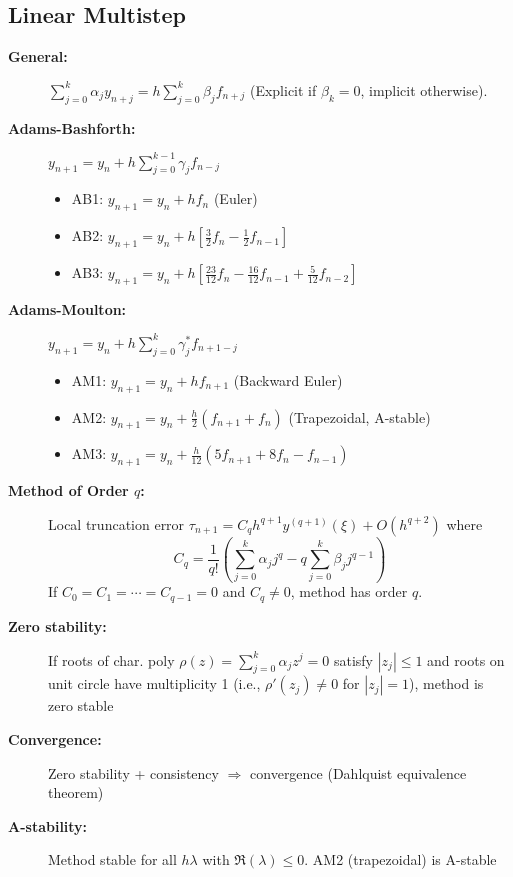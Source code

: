 \documentclass[a4paper,10pt,landscape]{article}
\begin{document}
\begin{multicols*}{3}
    \subsection*{Linear Multistep}
    \begin{description}
        \item[\textbf{General:}] $\sum_{j=0}^k \alpha_j y_{n+j} = h\sum_{j=0}^k \beta_j f_{n+j}$ (Explicit if $\beta_k=0$, implicit otherwise).
        \item[\textbf{Adams-Bashforth:}] $y_{n+1} = y_n + h\sum_{j=0}^{k-1} \gamma_j f_{n-j}$
              \begin{itemize}
                  \item AB1: $y_{n+1} = y_n + hf_n$ (Euler)
                  \item AB2: $y_{n+1} = y_n + h[\frac{3}{2}f_n - \frac{1}{2}f_{n-1}]$
                  \item AB3: $y_{n+1} = y_n + h[\frac{23}{12}f_n - \frac{16}{12}f_{n-1} + \frac{5}{12}f_{n-2}]$
              \end{itemize}
        \item[\textbf{Adams-Moulton:}] $y_{n+1} = y_n + h\sum_{j=0}^k \gamma_j^* f_{n+1-j}$
              \begin{itemize}
                  \item AM1: $y_{n+1} = y_n + hf_{n+1}$ (Backward Euler)
                  \item AM2: $y_{n+1} = y_n + \frac{h}{2}(f_{n+1} + f_n)$ (Trapezoidal, A-stable)
                  \item AM3: $y_{n+1} = y_n + \frac{h}{12}(5f_{n+1} + 8f_n - f_{n-1})$
              \end{itemize}
        \item[\textbf{Method of Order $q$:}] Local truncation error $\tau_{n+1} = C_q h^{q+1} y^{(q+1)}(\xi) + O(h^{q+2})$ where
              \[C_q = \frac{1}{q!}\left(\sum_{j=0}^k \alpha_j j^q - q \sum_{j=0}^k \beta_j j^{q-1}\right)\]
              If $C_0 = C_1 = \cdots = C_{q-1} = 0$ and $C_q \neq 0$, method has order $q$.
        \item[\textbf{Zero stability:}] If roots of char. poly $\rho(z) = \sum_{j=0}^k \alpha_j z^j = 0$ satisfy $|z_j| \leq 1$ and roots on unit circle have multiplicity 1 (i.e., $\rho'(z_j) \neq 0$ for $|z_j|=1$), method is zero stable
        \item[\textbf{Convergence:}] Zero stability + consistency $\Rightarrow$ convergence (Dahlquist equivalence theorem)
        \item[\textbf{A-stability:}] Method stable for all $h\lambda$ with $\Re(\lambda) \leq 0$. AM2 (trapezoidal) is A-stable
    \end{description}


\end{multicols*}
\end{document}
